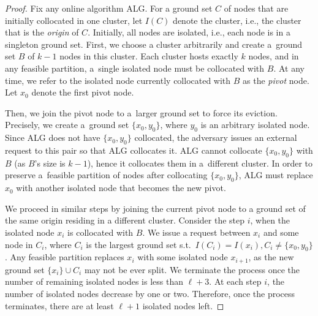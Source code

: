 \documentclass[a4paper,anonymous,USenglish]{lipics-v2019}
\newcommand{\ALG}{\textsc{ALG}\xspace}
\begin{document}
\begin{proof}
	Fix any online algorithm \ALG.
	For a ground set $C$ of nodes that are initially collocated in one cluster,
	let $I(C)$ denote the cluster,
	i.e., the cluster that is the \emph{origin} of $C$.
	Initially, all nodes are isolated, i.e., each node is in a singleton ground set.
	First, we choose a cluster arbitrarily and
	 create a~ground set $B$ of $k-1$ nodes in this cluster.
	Each cluster hosts exactly $k$ nodes, and in any feasible partition,
	 a~single isolated node must be collocated with $B$.
	At any time,
	we refer to the isolated node currently collocated with $B$ as the \emph{pivot} node.
	Let $x_0$ denote the first pivot node.

	Then, we join the pivot node to a~larger ground set to force its eviction.
	Precisely,
	we create a~ground set $\{x_0, y_0\}$, 	where
	 $y_0$ is an arbitrary isolated node.
	Since \ALG does not have $\{x_0,y_0\}$ collocated, 
	the adversary issues an external request to this pair so that \ALG collocates it.
	\ALG cannot collocate $\{x_0, y_0\}$ with $B$ (as $B$'s size is $k-1$), hence it collocates them in a~different cluster.
	In order to preserve a~feasible partition of nodes after collocating $\{x_0, y_0\}$,
	\ALG must replace $x_0$ with another isolated node that becomes the new pivot.

	We proceed in similar steps by joining the current pivot node to a ground set of the same origin residing in a different cluster.
	Consider the step $i$,
	when the isolated node $x_i$ is collocated with $B$.
	 We issue a request between $x_i$ and some node in $C_i$,
	 where $C_i$ is the largest ground set
	 s.t.~$I(C_i) = I(x_i), C_i \neq \{x_0,y_0\}$.
	Any feasible partition replaces $x_i$ with some isolated node $x_{i+1}$,
	as the new ground set $\{x_i\} \cup C_i $  may not be ever split.
	We terminate the process once the number of remaining isolated nodes 
	is less than $\ell+3$.
	At each step $i$,
	the number of isolated nodes decrease by one or two.
	Therefore, once the process terminates,
	there are at least $\ell+1$ isolated nodes left.
	

\end{proof}
\end{document}
